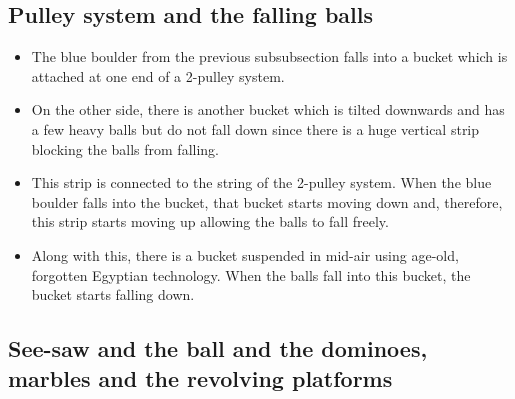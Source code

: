 \documentclass[11pt]{article}
\begin{document}
\subsection{Pulley system and the falling balls}

\begin{itemize}
	\item The blue boulder from the previous subsubsection falls into a bucket which is attached at one end of a 2-pulley system.
	\item On the other side, there is another bucket which is tilted downwards and has a few heavy balls but do not fall down since there is a huge vertical strip blocking the balls from falling. 
	\item This strip is connected to the string of the 2-pulley system. When the blue boulder falls into the bucket, that bucket starts moving down and, therefore, this strip starts moving up allowing the balls to fall freely.
	\item Along with this, there is a bucket suspended in mid-air using age-old, forgotten Egyptian technology. When the balls fall into this bucket, the bucket starts falling down.
	\end{itemize}
\subsection{See-saw and the ball and the dominoes, marbles and the revolving platforms}
\end{document}
